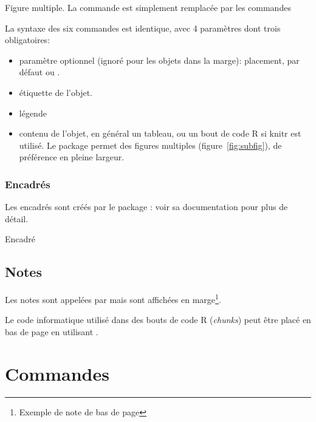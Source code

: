 \documentclass[
  a4paper, %
  11pt, extrafontsizes, %
  onecolumn, %
  openright, %
]{memoir}
\begin{document}
{Figure multiple. La commande  est simplement remplacée par les commandes }
{
	\hfill
}

La syntaxe des six commandes est identique, avec 4 paramètres dont trois obligatoires:
\begin{itemize}
  \item paramètre optionnel (ignoré pour les objets dans la marge): placement, par défaut \code{[htbp]} ou \code{[tbp]}.
  \item étiquette de l'objet.
  \item légende
  \item contenu de l'objet, en général un tableau,  ou un bout de code R si knitr est utilisé. Le package  permet des figures multiples (figure~\ref{fig:subfig}), de préférence en pleine largeur.
\end{itemize}


\subsubsection{Encadrés}

Les encadrés sont créés par le package : voir sa documentation pour plus de détail.

\begin{bclogo}[logo=\bctrombone, noborder=true, couleur=lightgray!50]{Encadré}
  \lipsum[2]
\end{bclogo}


\subsection{Notes}

Les notes sont appelées par  mais sont affichées en marge\footnote{Exemple de note de \og bas de page\fg{}}.

Le code informatique utilisé dans des bouts de code R (\foreignlanguage{english}{\emph{chunks}}) peut être placé en bas de page en utilisant  
.


\section{Commandes}
\end{document}
